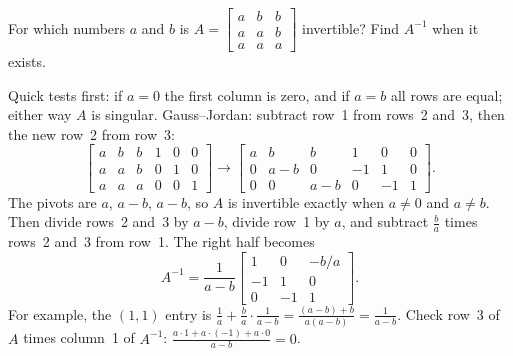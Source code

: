 \begin{exercise}\label{ex:u04-ab}
For which numbers $a$ and $b$ is $A=\begin{bmatrix} a&b&b\\ a&a&b\\ a&a&a\end{bmatrix}$
invertible? Find $A^{-1}$ when it exists.
\end{exercise}
\begin{solution}
Quick tests first: if $a=0$ the first column is zero, and if $a=b$ all rows are equal; either
way $A$ is singular. Gauss--Jordan: subtract row~1 from rows~2 and~3, then the new row~2 from
row~3:
\[
  \left[\begin{array}{ccc|ccc} a&b&b&1&0&0\\ a&a&b&0&1&0\\ a&a&a&0&0&1\end{array}\right]
  \to
  \left[\begin{array}{ccc|ccc} a&b&b&1&0&0\\ 0&a-b&0&-1&1&0\\ 0&0&a-b&0&-1&1\end{array}\right].
\]
The pivots are $a$, $a-b$, $a-b$, so $A$ is invertible exactly when $a\neq0$ and $a\neq b$.
Then divide rows~2 and~3 by $a-b$, divide row~1 by $a$, and subtract $\tfrac ba$ times rows~2
and~3 from row~1. The right half becomes
\[
  A^{-1}=\frac{1}{a-b}\begin{bmatrix} 1&0&-b/a\\ -1&1&0\\ 0&-1&1\end{bmatrix}.
\]
For example, the $(1,1)$ entry is $\frac1a+\frac ba\cdot\frac{1}{a-b}=\frac{(a-b)+b}{a(a-b)}=\frac{1}{a-b}$.
Check row~3 of $A$ times column~1 of $A^{-1}$: $\frac{a\cdot1+a\cdot(-1)+a\cdot0}{a-b}=0$.
\end{solution}

